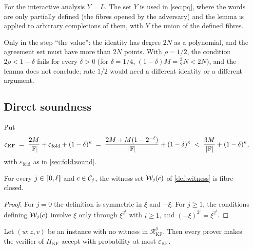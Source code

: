\begin{remark}\label{rem:Y}
For the interactive analysis $Y = L$. The set $Y$ is used in \cref{sec:pq}, where the words are only partially defined (the fibres opened by the adversary) and the lemma is applied to arbitrary completions of them, with $Y$ the union of the defined fibres.
\end{remark}

\begin{remark}\label{rem:where-rate}
Only in the step ``the value'': the identity has degree $2N$ as a polynomial, and the agreement set must have more than $2N$ points. With $\rho = 1/2$, the condition $2\rho < 1-\delta$ fails for every $\delta > 0$ (for $\delta = 1/4$, $(1-\delta)M = \tfrac32 N < 2N$), and the lemma does not conclude; rate $1/2$ would need a different identity or a different argument.
\end{remark}

\subsection{Direct soundness}\label{sec:sound:direct}

Put
\[
  \varepsilon_{\mathrm{KF}} \;=\; \frac{2M}{|\mathbb{F}|} + \varepsilon_{\mathrm{fold}} + (1-\delta)^\kappa \;=\; \frac{2M + M(1-2^{-\ell})}{|\mathbb{F}|} + (1-\delta)^\kappa \;<\; \frac{3M}{|\mathbb{F}|} + (1-\delta)^\kappa,
\]
with $\varepsilon_{\mathrm{fold}}$ as in \cref{sec:fold:sound}.

\begin{lemma}\label{lem:fibre-closed}
For every $j \in \llbracket 0, \ell \rrbracket$ and $c \in \mathcal{C}_j$, the witness set $\mathcal{W}_j(c)$ of \cref{def:witness} is fibre-closed.
\end{lemma}

\begin{proof}
For $j = 0$ the definition is symmetric in $\xi$ and $-\xi$. For $j \ge 1$, the conditions defining $\mathcal{W}_j(c)$ involve $\xi$ only through $\xi^{2^i}$ with $i \ge 1$, and $(-\xi)^{2^i} = \xi^{2^i}$.
\end{proof}

\begin{theorem}[Soundness]\label{thm:sound}
Let $(w;z,v)$ be an instance with no witness in $\mathcal{R}^\delta_{\mathrm{KF}}$. Then every prover makes the verifier of $\Pi_{\mathrm{KF}}$ accept with probability at most $\varepsilon_{\mathrm{KF}}$.
\end{theorem}


